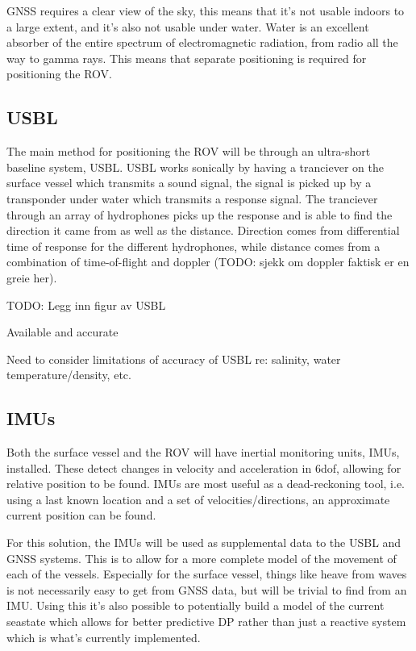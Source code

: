 \documentclass[class=article, crop=false, draft=true]{standalone}
\begin{document}
GNSS requires a clear view of the sky, this means that it's not usable indoors to a large extent, and it's also not usable under water. Water is an excellent absorber of the entire spectrum of electromagnetic radiation, from radio all the way to gamma rays. This means that separate positioning is required for positioning the ROV.

\subsection{USBL}
The main method for positioning the ROV will be through an ultra-short baseline system, USBL. USBL works sonically by having a tranciever on the surface vessel which transmits a sound signal, the signal is picked up by a transponder under water which transmits a response signal. The tranciever through an array of hydrophones picks up the response and is able to find the direction it came from as well as the distance. Direction comes from differential time of response for the different hydrophones, while distance comes from a combination of time-of-flight and doppler (TODO: sjekk om doppler faktisk er en greie her).

TODO: Legg inn figur av USBL

Available and accurate

Need to consider limitations of accuracy of USBL re: salinity, water temperature/density, etc.

\subsection{IMUs}
Both the surface vessel and the ROV will have inertial monitoring units, IMUs, installed. These detect changes in velocity and acceleration in 6dof, allowing for relative position to be found. IMUs are most useful as a dead-reckoning tool, i.e. using a last known location and a set of velocities/directions, an approximate current position can be found.

For this solution, the IMUs will be used as supplemental data to the USBL and GNSS systems. This is to allow for a more complete model of the movement of each of the vessels. Especially for the surface vessel, things like heave from waves is not necessarily easy to get from GNSS data, but will be trivial to find from an IMU. Using this it's also possible to potentially build a model of the current seastate which allows for better predictive DP rather than just a reactive system which is what's currently implemented.
\end{document}
